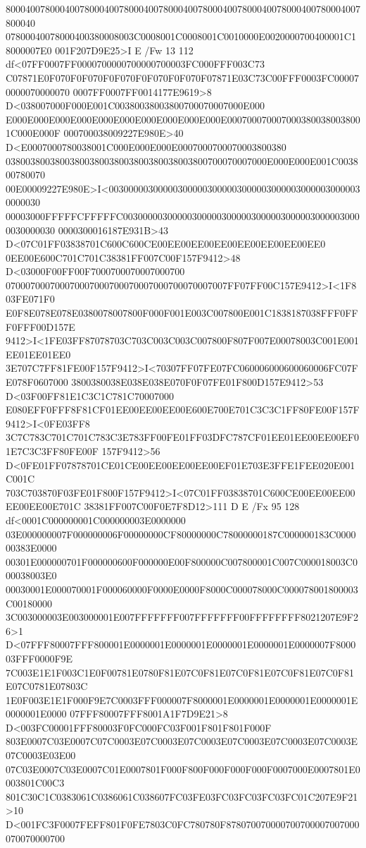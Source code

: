 800040078000400780004007800040078000400780004007800040078000400780004007800040
07800040078000400380008003C0008001C0008001C0010000E0020000700400001C18000007E0
001F207D9E25>I E /Fw 13 112 df<07FF0007FF0000700000700000700003FC000FFF003C73
C07871E0F070F0F070F0F070F0F070F0F070F07871E03C73C00FFF0003FC000070000070000070
0007FF0007FF0014177E9619>8 D<038007000F000E001C00380038003800700070007000E000
E000E000E000E000E000E000E000E000E000E000E0007000700070003800380038001C000E000F
000700038009227E980E>40 D<E0007000780038001C000E000E000E0007000700070003800380
03800380038003800380038003800380038003800700070007000E000E000E001C003800780070
00E00009227E980E>I<0030000030000030000030000030000030000030000030000030000030
00003000FFFFFCFFFFFC0030000030000030000030000030000030000030000030000030000030
0000300016187E931B>43 D<07C01FF03838701C600C600CE00EE00EE00EE00EE00EE00EE00EE0
0EE00E600C701C701C38381FF007C00F157F9412>48 D<03000F00FF00F7000700070007000700
070007000700070007000700070007000700070007007FF07FF00C157E9412>I<1F803FE071F0
E0F8E078E078E0380078007800F000F001E003C007800E001C1838187038FFF0FFF0FFF00D157E
9412>I<1FE03FF87078703C703C003C003C007800F807F007E00078003C001E001EE01EE01EE0
3E707C7FF81FE00F157F9412>I<70307FF07FE07FC060006000600060006FC07FE078F0607000
3800380038E038E038E070F0F07FE01F800D157E9412>53 D<03F00FF81E1C3C1C781C70007000
E080EFF0FFF8F81CF01EE00EE00EE00E600E700E701C3C3C1FF80FE00F157F9412>I<0FE03FF8
3C7C783C701C701C783C3E783FF00FE01FF03DFC787CF01EE01EE00EE00EF01E7C3C3FF80FE00F
157F9412>56 D<0FE01FF07878701CE01CE00EE00EE00EE00EF01E703E3FFE1FEE020E001C001C
703C703870F03FE01F800F157F9412>I<07C01FF03838701C600CE00EE00EE00EE00EE00E701C
38381FF007C00F0E7F8D12>111 D E /Fx 95 128 df<0001C000000001C000000003E0000000
03E000000007F000000006F00000000CF80000000C78000000187C000000183C000000383E0000
00301E000000701F000000600F000000E00F800000C007800001C007C000018003C000038003E0
00030001E000070001F000060000F0000E0000F8000C000078000C000078001800003C00180000
3C003000003E003000001E007FFFFFFF007FFFFFFF00FFFFFFFF8021207E9F26>1
D<07FFF80007FFF800001E0000001E0000001E0000001E0000001E0000007F800003FFF0000F9E
7C003E1E1F003C1E0F00781E0780F81E07C0F81E07C0F81E07C0F81E07C0F81E07C0781E07803C
1E0F003E1E1F000F9E7C0003FFF000007F8000001E0000001E0000001E0000001E0000001E0000
07FFF80007FFF8001A1F7D9E21>8 D<003FC00001FFF80003F0FC000FC03F001F801F801F000F
803E0007C03E0007C07C0003E07C0003E07C0003E07C0003E07C0003E07C0003E07C0003E03E00
07C03E0007C03E0007C01E0007801F000F800F000F000F000F0007000E0007801E0003801C00C3
801C30C1C0383061C0386061C038607FC03FE03FC03FC03FC03FC01C207E9F21>10
D<001FC3F0007FEFF801F0FE7803C0FC780780F878070070000700700007007000070070000700
